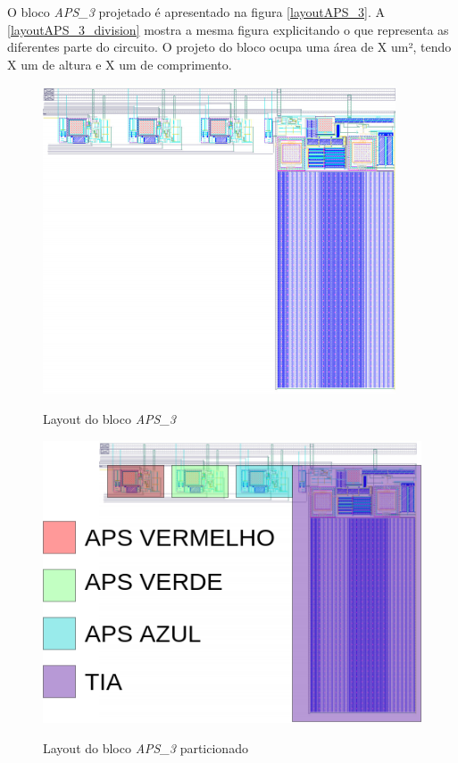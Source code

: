 O bloco \textit{APS\_3} projetado é apresentado na figura \autoref{layoutAPS_3}. A \autoref{layoutAPS_3_division} mostra a mesma figura explicitando o que representa as diferentes parte do circuito. O projeto do bloco ocupa uma área de X um², tendo X um de altura e X um de comprimento.

\begin{figure}[htb]
 \centering
    \centering
    \caption{Layout do bloco \textit{APS\_3}} 
    \includegraphics[scale=0.8]{Resultados/Imagens/APS_3.png}
    \label{layoutAPS_3}
\end{figure}

\begin{figure}[htb]
 \centering
    \centering
    \caption{Layout do bloco \textit{APS\_3} particionado} 
    \includegraphics[scale=0.3]{Resultados/Imagens/Image_APS_3.png}
    \label{layoutAPS_3_division}
\end{figure}

